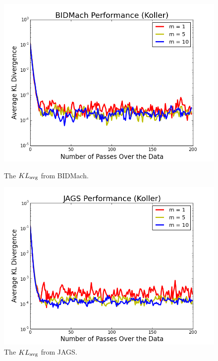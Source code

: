 \documentclass{article} %
\begin{document}
\begin{figure}[t]
  \centering
  \begin{minipage}{.5\textwidth}
    \centering
    \includegraphics[width=1\textwidth]{fig_kldiv_koller_mb4_gpu}
    \caption{The $KL_{\rm avg}$ from BIDMach.}
    \label{fig:kl_bidmach}
  \end{minipage}\hfill
    \begin{minipage}{.5\textwidth}
    \centering
    \includegraphics[width=1\textwidth]{fig_kl_div_25_50_perc_jags}
    \caption{The $KL_{\rm avg}$ from JAGS.}
    \label{fig:kl_jags}
  \end{minipage}
\end{figure}
\end{document}
